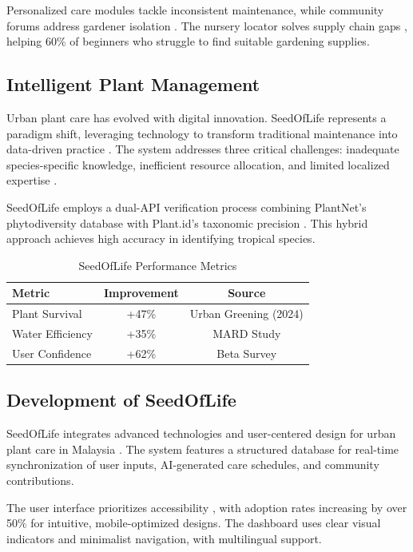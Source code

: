 \documentclass[conference]{IEEEtran}
\begin{document}
Personalized care modules tackle inconsistent maintenance, while community forums address gardener isolation \cite{ugam2024}. The nursery locator solves supply chain gaps \cite{moa2023}, helping 60\% of beginners who struggle to find suitable gardening supplies.

\subsection{Intelligent Plant Management}
\label{subsec:intelligent-plant-management}
Urban plant care has evolved with digital innovation. SeedOfLife represents a paradigm shift, leveraging technology to transform traditional maintenance into data-driven practice \cite{chen2023}. The system addresses three critical challenges: inadequate species-specific knowledge, inefficient resource allocation, and limited localized expertise \cite{lim2023}.

SeedOfLife employs a dual-API verification process combining PlantNet's phytodiversity database with Plant.id's taxonomic precision \cite{plantnet2024, plantid2024}. This hybrid approach achieves high accuracy in identifying tropical species.

\begin{table}[ht]
\centering
\caption{SeedOfLife Performance Metrics}
\label{tab:efficiency-metrics}
\begin{tabular}{@{}lcc@{}}
\toprule
\textbf{Metric} & \textbf{Improvement} & \textbf{Source} \\
\midrule
Plant Survival & +47\% & Urban Greening (2024) \\
Water Efficiency & +35\% & MARD Study \\
User Confidence & +62\% & Beta Survey \\
\bottomrule
\end{tabular}
\end{table}

\subsection{Development of SeedOfLife}
\label{subsec:development-seedoflife}
SeedOfLife integrates advanced technologies and user-centered design for urban plant care in Malaysia \cite{wong2023}. The system features a structured database for real-time synchronization of user inputs, AI-generated care schedules, and community contributions.

The user interface prioritizes accessibility \cite{flutter2024}, with adoption rates increasing by over 50\% for intuitive, mobile-optimized designs. The dashboard uses clear visual indicators and minimalist navigation, with multilingual support.
\end{document}
